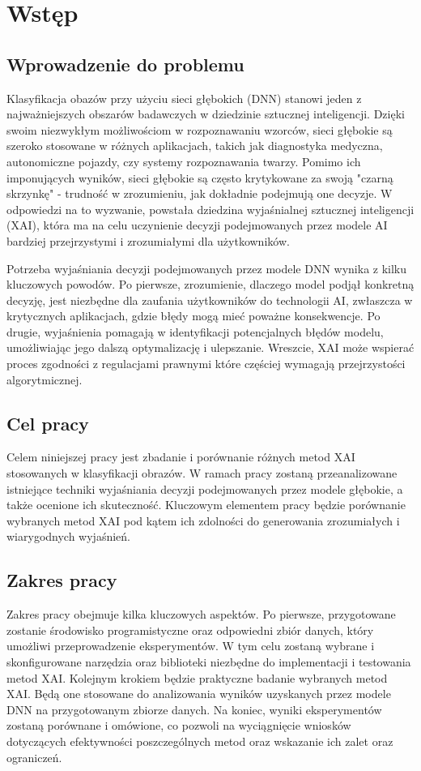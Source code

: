 
\chapter*{Wstęp}

\section*{Wprowadzenie do problemu}
Klasyfikacja obazów przy użyciu sieci głębokich (DNN) stanowi jeden z najważniejszych obszarów badawczych w dziedzinie sztucznej inteligencji.
Dzięki swoim niezwykłym możliwościom w rozpoznawaniu wzorców, sieci głębokie są szeroko stosowane w różnych aplikacjach, takich jak diagnostyka medyczna, autonomiczne pojazdy, czy systemy rozpoznawania twarzy.
Pomimo ich imponujących wyników, sieci głębokie są często krytykowane za swoją "czarną skrzynkę" - trudność w zrozumieniu, jak dokładnie podejmują one decyzje.
W odpowiedzi na to wyzwanie, powstała dziedzina wyjaśnialnej sztucznej inteligencji (XAI), która ma na celu uczynienie decyzji podejmowanych przez modele AI bardziej przejrzystymi i zrozumiałymi dla użytkowników.

Potrzeba wyjaśniania decyzji podejmowanych przez modele DNN wynika z kilku kluczowych powodów.
Po pierwsze, zrozumienie, dlaczego model podjął konkretną decyzję, jest niezbędne dla zaufania użytkowników do technologii AI, zwłaszcza w krytycznych aplikacjach, gdzie błędy mogą mieć poważne konsekwencje.
Po drugie, wyjaśnienia pomagają w identyfikacji potencjalnych błędów modelu, umożliwiając jego dalszą optymalizację i ulepszanie.
Wreszcie, XAI może wspierać proces zgodności z regulacjami prawnymi które częściej wymagają przejrzystości algorytmicznej.

\section*{Cel pracy}
Celem niniejszej pracy jest zbadanie i porównanie różnych metod XAI stosowanych w klasyfikacji obrazów.
W ramach pracy zostaną przeanalizowane istniejące techniki wyjaśniania decyzji podejmowanych przez modele głębokie, a także ocenione ich skuteczność.
Kluczowym elementem pracy będzie porównanie wybranych metod XAI pod kątem ich zdolności do generowania zrozumiałych i wiarygodnych wyjaśnień.

\section*{Zakres pracy}
Zakres pracy obejmuje kilka kluczowych aspektów.
Po pierwsze, przygotowane zostanie środowisko programistyczne oraz odpowiedni zbiór danych, który umożliwi przeprowadzenie eksperymentów.
W tym celu zostaną wybrane i skonfigurowane narzędzia oraz biblioteki niezbędne do implementacji i testowania metod XAI.
Kolejnym krokiem będzie praktyczne badanie wybranych metod XAI.
Będą one stosowane do analizowania wyników uzyskanych przez modele DNN na przygotowanym zbiorze danych.
Na koniec, wyniki eksperymentów zostaną porównane i omówione, co pozwoli na wyciągnięcie wniosków dotyczących efektywności poszczególnych metod oraz wskazanie ich zalet oraz ograniczeń.
